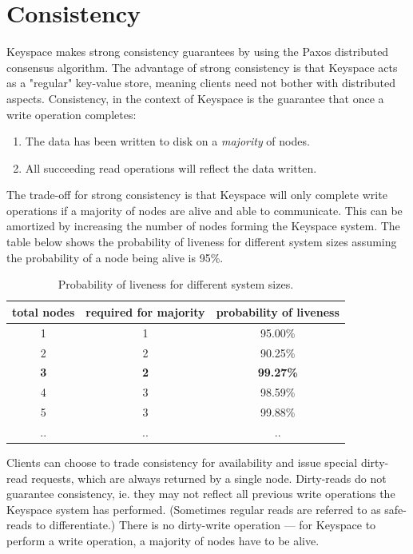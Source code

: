 \documentclass[12pt]{article}
\begin{document}
\section{ Consistency }

Keyspace makes strong consistency guarantees by using the Paxos distributed consensus algorithm. The advantage of strong consistency is that Keyspace acts as a "regular" key-value store, meaning clients need not bother with distributed aspects. Consistency, in the context of Keyspace is the guarantee that once a write operation completes:

\begin{enumerate}
\item The data has been written to disk on a \textit{majority} of nodes.
\item All succeeding read operations will reflect the data written.
\end{enumerate}

The trade-off for strong consistency is that Keyspace will only complete write operations if a majority of nodes are alive and able to communicate. This can be amortized by increasing the number of nodes forming the Keyspace system. The table below shows the probability of liveness for different system sizes assuming the probability of a node being alive is 95\%.

\begin{table}[h]
\begin{center}
\begin{tabular}{ | c | c | c | }
\hline
total nodes & required for majority & probability of liveness \\
\hline \hline
1 & 1 & 95.00\% \\ \hline
2 & 2 & 90.25\% \\ \hline
\textbf{3} & \textbf{2} & \textbf{99.27\%} \\ \hline
4 & 3 & 98.59\% \\ \hline
5 & 3 & 99.88\% \\ \hline
.. & .. & .. \\ \hline
\end{tabular}
\caption{ Probability of liveness for different system sizes. }
\end{center}
\end{table}

Clients can choose to trade consistency for availability and issue special dirty-read requests, which are always returned by a single node. Dirty-reads do not guarantee consistency, ie. they may not reflect all previous write operations the Keyspace system has performed. (Sometimes regular reads are referred to as safe-reads to differentiate.) There is no dirty-write operation --- for Keyspace to perform a write operation, a majority of nodes have to be alive.
\end{document}
